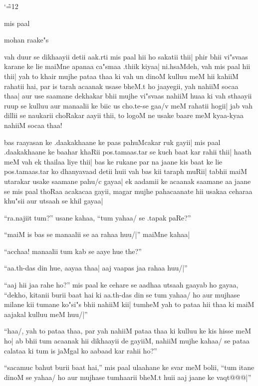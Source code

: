 \documentclass[11pt]{article}
\begin{document}
\pagestyle{empty}

\catcode`\~=12 %

\begin{center}
{\LARGE mis paal}
\end{center}

\begin{center}
{\large mohan raake"s}
\end{center}

vah duur se dikhaayii detii aak.rti mis paal hii ho sakatii thii|
phir bhii vi"svaas karane ke lie maiMne apanaa ca"smaa .thiik kiyaa|
ni.hsaMdeh, vah mis paal hii thii| yah to khair mujhe pataa thaa ki
vah un dinoM kulluu meM hii kahiiM rahatii hai, par is tarah acaanak usase
bheM.t ho jaayegii, yah nahiiM socaa thaa| aur use saamane dekhakar bhii
mujhe vi"svaas nahiiM huaa ki vah sthaayii ruup se kulluu aur manaalii
ke biic us cho.te-se gaa/v meM rahatii hogii| jab vah dillii se naukarii
choRakar aayii thii, to logoM ne usake baare meM kyaa-kyaa nahiiM socaa
thaa!

bas raayasan ke .daakakhaane ke paas pahuMcakar ruk gayii| mis paal
.daakakhaane ke baahar khaRii pos.tamaas.tar se kuch baat kar rahii thii|
haath meM vah ek thailaa liye thii| bas ke rukane par na jaane kis baat ke
lie pos.tamaas.tar ko dhanyavaad detii huii vah bas kii taraph muRii|
tabhii maiM utarakar usake saamane pahu/c gayaa| ek aadamii ke acaanak
saamane aa jaane se mis paal thoRaa acakacaa gayii, magar mujhe pahacaanate
hii usakaa ceharaa khu"sii aur utsaah se khil gayaa|

``ra.najiit tum?'' usane kahaa, ``tum yahaa/ se .tapak paRe?''

``maiM is bas se manaalii se aa rahaa huu/|'' maiMne kahaa|

``acchaa! manaalii tum kab se aaye hue the?''

``aa.th-das din hue, aayaa thaa| aaj vaapas jaa rahaa huu/|''

``aaj hii jaa rahe ho?'' mis paal ke cehare se aadhaa utsaah gaayab ho
gayaa, ``dekho, kitanii burii baat hai ki aa.th-das din se tum yahaa/
ho aur mujhase milane kii tumane ko"si"s bhii nahiiM kii| tumheM yah to
pataa hii thaa ki maiM aajakal kulluu meM huu/|''

``haa/, yah to pataa thaa, par yah nahiiM pataa thaa ki kulluu ke kis
hisse meM ho| ab bhii tum acaanak hii dikhaayii de gayiiM, nahiiM
mujhe kahaa/ se pataa calataa ki tum is jaMgal ko aabaad kar rahii ho?''

``sacamuc bahut burii baat hai,'' mis paal ulaahane ke svar meM bolii,
``tum itane dinoM se yahaa/ ho aur mujhase tumhaarii bheM.t huii aaj
jaane ke vaqt@@@|''
\end{document}
